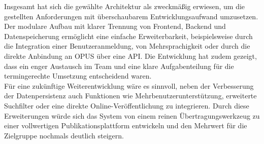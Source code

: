 \noindent Insgesamt hat sich die gewählte Architektur als zweckmäßig erwiesen, um die gestellten Anforderungen mit überschaubarem 
Entwicklungsaufwand umzusetzen. Der modulare Aufbau mit klarer Trennung von Frontend, Backend und Datenspeicherung 
ermöglicht eine einfache Erweiterbarkeit, beispielsweise durch die Integration einer Benutzeranmeldung, 
von Mehrsprachigkeit oder durch die direkte Anbindung an OPUS über eine API. Die Entwicklung hat zudem gezeigt, 
dass ein enger Austausch im Team und eine klare Aufgabenteilung für die termingerechte Umsetzung entscheidend waren.\\

\noindent Für eine zukünftige Weiterentwicklung wäre es sinnvoll, neben der Verbesserung der Datenpersistenz auch Funktionen 
wie Mehrbenutzerunterstützung, erweiterte Suchfilter oder eine direkte Online-Veröffentlichung zu integrieren. 
Durch diese Erweiterungen würde sich das System von einem reinen Übertragungswerkzeug zu einer vollwertigen 
Publikationsplattform entwickeln und den Mehrwert für die Zielgruppe nochmals deutlich steigern.